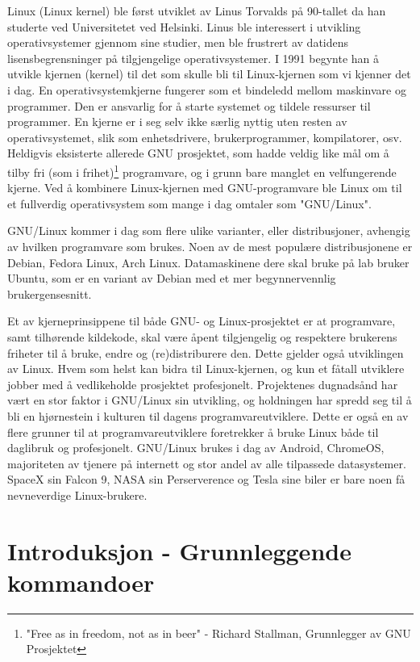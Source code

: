 \begin{alphasection}
Linux (Linux kernel) ble først utviklet av Linus Torvalds på 90-tallet da han studerte ved Universitetet ved Helsinki. Linus ble interessert i utvikling operativsystemer gjennom sine studier, men ble frustrert av datidens lisensbegrensninger på tilgjengelige operativsystemer. I 1991 begynte han å utvikle kjernen (kernel) til det som skulle bli til Linux-kjernen som vi kjenner det i dag. En operativsystemkjerne fungerer som et bindeledd mellom maskinvare og programmer. Den er ansvarlig for å starte systemet og tildele ressurser til programmer. En kjerne er i seg selv ikke særlig nyttig uten resten av operativsystemet, slik som enhetsdrivere, brukerprogrammer, kompilatorer, osv. Heldigvis eksisterte allerede GNU prosjektet, som hadde veldig like mål om å tilby fri (som i frihet)\footnote{"Free as in freedom, not as in beer" - Richard Stallman, Grunnlegger av GNU Prosjektet} programvare, og i grunn bare manglet en velfungerende kjerne. Ved å kombinere Linux-kjernen med GNU-programvare ble Linux om til et fullverdig operativsystem som mange i dag omtaler som "GNU/Linux". 

GNU/Linux kommer i dag som flere ulike varianter, eller distribusjoner, avhengig av hvilken programvare som brukes. Noen av de mest populære distribusjonene er Debian, Fedora Linux, Arch Linux. Datamaskinene dere skal bruke på lab bruker Ubuntu, som er en variant av Debian med et mer begynnervennlig brukergensesnitt.

Et av kjerneprinsippene til både GNU- og Linux-prosjektet er at programvare, samt tilhørende kildekode, skal være åpent tilgjengelig og respektere brukerens friheter til å bruke, endre og (re)distriburere den. Dette gjelder også utviklingen av Linux. Hvem som helst kan bidra til Linux-kjernen, og kun et fåtall utviklere jobber med å vedlikeholde prosjektet profesjonelt. Projektenes dugnadsånd har vært en stor faktor i GNU/Linux sin utvikling, og holdningen har spredd seg til å bli en hjørnestein i kulturen til dagens programvareutviklere. Dette er også en av flere grunner til at programvareutviklere foretrekker å bruke Linux både til daglibruk og profesjonelt. GNU/Linux brukes i dag av Android, ChromeOS, majoriteten av tjenere på internett og stor andel av alle tilpassede datasystemer. SpaceX sin Falcon 9, NASA sin Perserverence og Tesla sine biler er bare noen få nevneverdige Linux-brukere. 



\section{Introduksjon - Grunnleggende kommandoer}\label{sec:2-innføring}


\end{alphasection}
